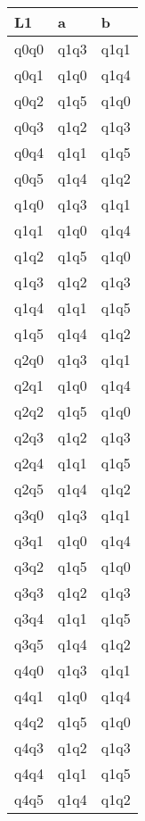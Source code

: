 \documentclass[fleqn]{article}
\begin{document}
 \begin{tabular}{ | l | l | l | }
\hline
L1 & a & b \\ \hline
q0q0 &  q1q3 & q1q1 \\
q0q1 &  q1q0 & q1q4 \\
q0q2 &  q1q5 & q1q0 \\
q0q3 &  q1q2 & q1q3 \\
q0q4 &  q1q1 & q1q5 \\
q0q5 &  q1q4 & q1q2 \\
q1q0 &  q1q3 & q1q1 \\
q1q1 &  q1q0 & q1q4 \\
q1q2 &  q1q5 & q1q0 \\
q1q3 &  q1q2 & q1q3 \\
q1q4 &  q1q1 & q1q5 \\
q1q5 &  q1q4 & q1q2 \\
q2q0 &  q1q3 & q1q1 \\
q2q1 &  q1q0 & q1q4 \\
q2q2 &  q1q5 & q1q0 \\
q2q3 &  q1q2 & q1q3 \\
q2q4 &  q1q1 & q1q5 \\
q2q5 &  q1q4 & q1q2 \\
q3q0 &  q1q3 & q1q1 \\
q3q1 &  q1q0 & q1q4 \\
q3q2 &  q1q5 & q1q0 \\
q3q3 &  q1q2 & q1q3 \\
q3q4 &  q1q1 & q1q5 \\
q3q5 &  q1q4 & q1q2 \\
q4q0 &  q1q3 & q1q1 \\
q4q1 &  q1q0 & q1q4 \\
q4q2 &  q1q5 & q1q0 \\
q4q3 &  q1q2 & q1q3 \\
q4q4 &  q1q1 & q1q5 \\
q4q5 &  q1q4 & q1q2 \\

\hline
\end{tabular}

\newpage
    
\end{document}
